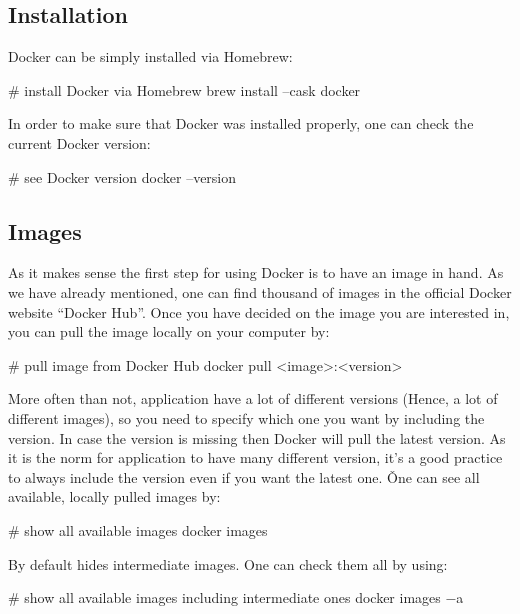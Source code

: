 \ee

\subsection{Installation}

Docker can be simply installed via Homebrew:

\begin{bash}
# install Docker via Homebrew
brew install --cask docker
\end{bash}

In order to make sure that Docker was installed properly, one can check the current Docker version:

\begin{bash}
# see Docker version
docker --version
\end{bash}

\subsection{Images}

As it makes sense the first step for using Docker is to have an image in hand. As we have already mentioned, one can
find thousand of images in the official Docker website ``Docker Hub''. Once you have decided on the image you are
interested in, you can pull the image locally on your computer by:

\begin{bash}
# pull image from Docker Hub
docker pull <image>:<version>
\end{bash}

More often than not, application have a lot of different versions (Hence, a lot of different images), so you need to
specify which one you want by including the version. In case the version is missing then Docker will pull the latest
version. As it is the norm for application to have many different version, it's a good practice to always include the
version even if you want the latest one. \v

One can see all available, locally pulled images by:

\begin{bash}
# show all available images
docker images
\end{bash}

By default  hides intermediate images. One can check them all by using:

\begin{bash}
# show all available images including intermediate ones
docker images $-$a
\end{bash}

